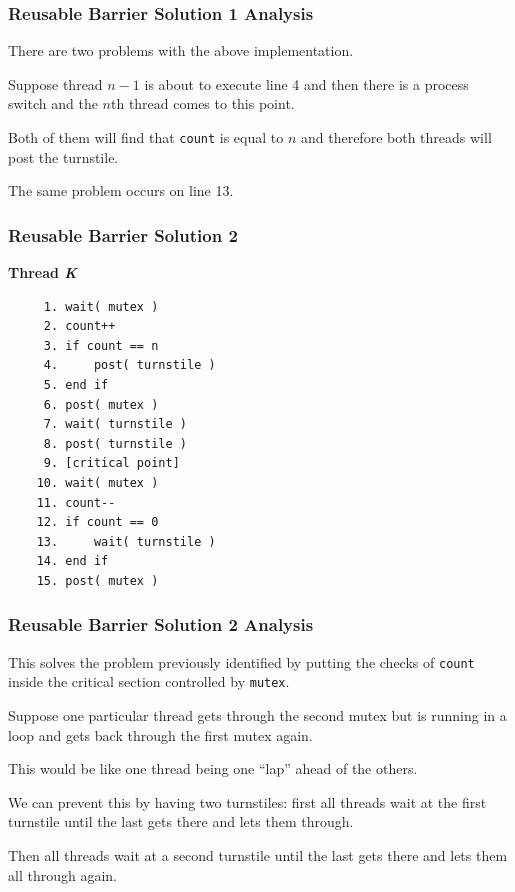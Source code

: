 \begin{frame}
	\frametitle{Reusable Barrier Solution 1 Analysis}

	There are two problems with the above implementation.

	Suppose thread $n-1$ is about to execute line 4 and then there is a process switch and the $n$th thread comes to this point.

	Both of them will find that \texttt{count} is equal to $n$ and therefore both threads will post the turnstile.

	The same problem occurs on line 13.


\end{frame}

\begin{frame}[fragile]
	\frametitle{Reusable Barrier Solution 2}

	\textbf{Thread \textit{K}}\vspace{-2em}
	\begin{verbatim}
	 1. wait( mutex )
	 2. count++
	 3. if count == n
	 4.     post( turnstile )
	 5. end if
	 6. post( mutex )
	 7. wait( turnstile )
	 8. post( turnstile )
	 9. [critical point]
	10. wait( mutex )
	11. count--
	12. if count == 0
	13.     wait( turnstile )
	14. end if
	15. post( mutex )
  \end{verbatim}
	\vspace{-2em}

\end{frame}


\begin{frame}
	\frametitle{Reusable Barrier Solution 2 Analysis}

	This solves the problem previously identified by putting the checks of \texttt{count} inside the critical section controlled by \texttt{mutex}.

	Suppose one particular thread gets through the second mutex but is running in a loop and gets back through the first mutex again.

	This would be like one thread being one ``lap'' ahead of the others.

	We can prevent this by having two turnstiles: first all threads wait at the first turnstile until the last gets there and lets them through.

	Then all threads wait at a second turnstile until the last gets there and lets them all through again.


\end{frame}

